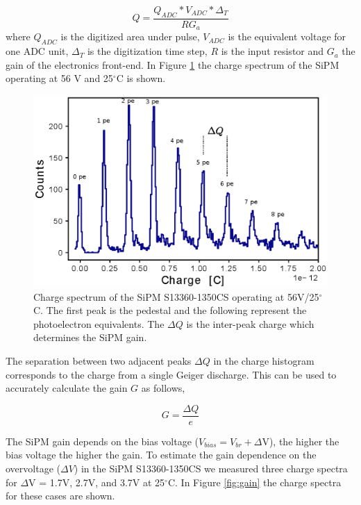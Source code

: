 \documentclass[a4paper,11pt]{article}
\begin{document}
\begin{equation}
\label{eq:y:3}
Q = \frac{Q_{ADC}*V_{ADC}*\Delta_T}{RG_a}
\end{equation}
where $Q_{ADC}$ is the digitized area under pulse, $V_{ADC}$ is the equivalent voltage for one ADC unit, $\Delta_T$ is the digitization time step, $R$ is the input resistor and $G_a$ the gain of the electronics front-end. In Figure \ref{fig:charge} the charge spectrum of the SiPM operating at 56 V and 25$^{\circ}$C is shown.


\begin{figure}[htbp]
\centering %
\includegraphics[width=.65\textwidth]{Figures/Charge.eps}
\caption{\label{fig:charge} Charge spectrum of the SiPM S13360-1350CS operating at 56V/25$^{\circ}$C. The first peak is the pedestal and the following represent the photoelectron equivalents. The $\Delta Q$ is the inter-peak charge which determines the SiPM gain.}
\end{figure}

The separation between two adjacent peaks $\Delta Q$ in the charge histogram corresponds to the charge from a single Geiger discharge. This can be used to accurately calculate the gain $G$ as follows,

\begin{equation}
\label{eq:y:3}
G = \frac{\Delta Q}{e}
\end{equation}

The SiPM gain depends on the bias voltage ($V_{bias} = V_{br} + \Delta$V), the higher the bias voltage the higher the gain. To estimate the gain dependence on the overvoltage ($\Delta V$) in the SiPM S13360-1350CS we measured three charge spectra for $\Delta$V = 1.7V, 2.7V, and 3.7V at 25$^{\circ}$C. In Figure \ref{fig:gain} the charge spectra for these cases are shown.
\end{document}
